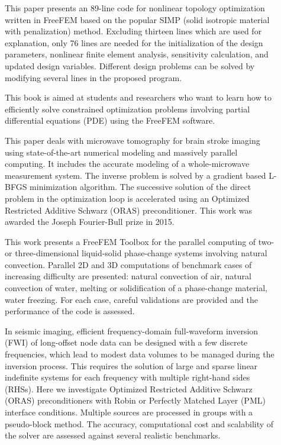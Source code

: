 \begin{description}
\item[] This paper presents an 89-line code for nonlinear topology optimization written in FreeFEM based on the popular SIMP (solid isotropic material with penalization) method. Excluding thirteen lines which are used for explanation, only 76 lines are needed for the initialization of the design parameters, nonlinear finite element analysis, sensitivity calculation, and updated design variables. Different design problems can be solved by modifying several lines in the proposed program.

\item[] This book is aimed at students and researchers who want to learn how to eﬃciently solve constrained optimization problems involving partial diﬀerential equations (PDE) using the FreeFEM software.

\item[] This paper deals with microwave tomography for brain stroke imaging using state-of-the-art numerical modeling and massively parallel computing. It includes the accurate modeling of a whole-microwave measurement system. The inverse problem is solved by a gradient based L-BFGS minimization algorithm. The successive solution of the direct problem in the optimization loop is accelerated using an Optimized Restricted Additive Schwarz (ORAS) preconditioner. This work was awarded the Joseph Fourier-Bull prize in 2015.

\item[] This work presents a FreeFEM Toolbox for the parallel computing of two- or three-dimensional liquid-solid phase-change systems involving natural convection. Parallel 2D and 3D computations of benchmark cases of increasing difficulty are presented: natural convection of air, natural convection of water, melting or solidification of a phase-change material, water freezing. For each case, careful validations are provided and the performance of the code is assessed. 

\item[] In seismic imaging, efficient frequency-domain full-waveform inversion (FWI) of long-offset node data can be designed with a few discrete frequencies, which lead to modest data volumes to be managed during the inversion process. This requires the solution of large and sparse linear indefinite systems for each frequency with multiple right-hand sides (RHSs). Here we investigate Optimized Restricted Additive Schwarz (ORAS) preconditioners with Robin or Perfectly Matched Layer (PML) interface conditions. Multiple sources are processed in groups with a pseudo-block method. The accuracy, computational cost and scalability of the solver are assessed against several realistic benchmarks.


\end{description}
